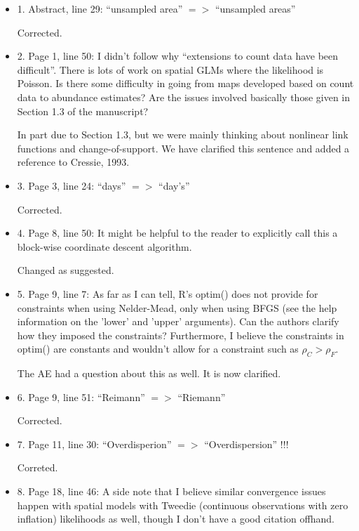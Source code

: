 \documentclass[12pt, titlepage]{article}
\begin{document}
\begin{itemize}

\item {\color{red!70!black} 1. Abstract, line 29: ``unsampled area'' $=>$ ``unsampled areas''}

  Corrected.

\item {\color{red!70!black} 2. Page 1, line 50: I didn't follow why ``extensions to count data have been difficult''. There is lots of work on spatial GLMs where the likelihood is Poisson. Is there some difficulty in going from maps developed based on count data to abundance estimates? Are the issues involved basically those given in Section 1.3 of the manuscript?}

  In part due to Section 1.3, but we were mainly thinking about nonlinear link functions and change-of-support.  We have clarified this sentence and added a reference to Cressie, 1993.

\item {\color{red!70!black} 3. Page 3, line 24: ``days'' $=>$ ``day's''}

  Corrected.

\item {\color{red!70!black} 4. Page 8, line 50: It might be helpful to the reader to explicitly call this a block-wise coordinate descent algorithm.}

  Changed as suggested.

\item {\color{red!70!black} 5. Page 9, line 7: As far as I can tell, R's optim() does not provide for constraints when using Nelder-Mead, only when using BFGS (see the help information on the 'lower' and 'upper' arguments). Can the authors clarify how they imposed the constraints? Furthermore, I believe the constraints in optim() are constants and wouldn’t allow for a constraint such as $\rho_C > \rho_F$.}

  The AE had a question about this as well.  It is now clarified.
  
\item {\color{red!70!black} 6. Page 9, line 51: ``Reimann'' $=>$ ``Riemann''}

  Corrected.

\item {\color{red!70!black} 7. Page 11, line 30: ``Overdisperion'' $=>$ ``Overdispersion'' !!!}

  Correted.

\item {\color{red!70!black} 8. Page 18, line 46: A side note that I believe similar convergence issues happen with spatial models with Tweedie (continuous observations with zero inflation) likelihoods as well, though I don't have a good citation offhand.
}


\end{itemize}
\end{document}
